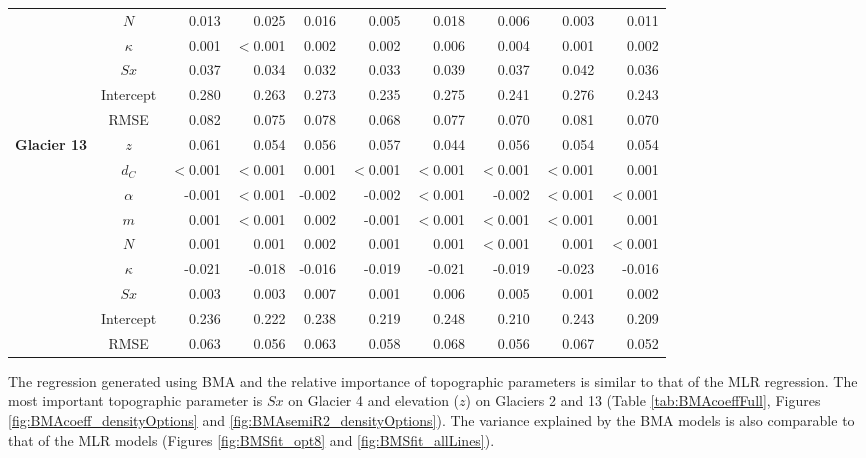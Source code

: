 \documentclass{sfuthesis}
\begin{document}
\begin{table}
\begin{tabular}{ccrrrrrrrr}
 & $N$ & 0.013 & 0.025 & 0.016 & 0.005 & 0.018 & 0.006 & 0.003 & 0.011 \\
 & $\kappa$ & 0.001 & $<$0.001 & 0.002 & 0.002 & 0.006 & 0.004 & 0.001 & 0.002 \\
 & $Sx$ & 0.037 & 0.034 & 0.032 & 0.033 & 0.039 & 0.037 & 0.042 & 0.036 \\
 & Intercept & 0.280 & 0.263 & 0.273 & 0.235 & 0.275 & 0.241 & 0.276 & 0.243 \\
 & RMSE & 0.082 & 0.075 & 0.078 & 0.068 & 0.077 & 0.070 & 0.081 & 0.070 \\ \hline
\multirow{9}{*}{\textbf{Glacier 13}} & $z$ & 0.061 & 0.054 & 0.056 & 0.057 & 0.044 & 0.056 & 0.054 & 0.054 \\
 & $d_C$ & $<$0.001 & $<$0.001 & 0.001 & $<$0.001 & $<$0.001 & $<$0.001 & $<$0.001 & 0.001 \\
 & $\alpha$ & -0.001 & $<$0.001 & -0.002 & -0.002 & $<$0.001 & -0.002 & $<$0.001 & $<$0.001 \\
 & $m$ & 0.001 & $<$0.001 & 0.002 & -0.001 & $<$0.001 & $<$0.001 & $<$0.001 & 0.001 \\
 & $N$ & 0.001 & 0.001 & 0.002 & 0.001 & 0.001 & $<$0.001 & 0.001 & $<$0.001 \\
 & $\kappa$ & -0.021 & -0.018 & -0.016 & -0.019 & -0.021 & -0.019 & -0.023 & -0.016 \\
 & $Sx$ & 0.003 & 0.003 & 0.007 & 0.001 & 0.006 & 0.005 & 0.001 & 0.002 \\
 & Intercept & 0.236 & 0.222 & 0.238 & 0.219 & 0.248 & 0.210 & 0.243 & 0.209 \\
 & RMSE & 0.063 & 0.056 & 0.063 & 0.058 & 0.068 & 0.056 & 0.067 & 0.052
\end{tabular}
\end{table}

The regression generated using BMA and the relative importance of topographic parameters is similar to that of the MLR regression. The most important topographic parameter is $Sx$ on Glacier 4 and elevation ($z$) on Glaciers 2 and 13 (Table \ref{tab:BMAcoeffFull}, Figures \ref{fig:BMAcoeff_densityOptions} and \ref{fig:BMAsemiR2_densityOptions}). The variance explained by the BMA models is also comparable to that of the MLR models (Figures \ref{fig:BMSfit_opt8} and \ref{fig:BMSfit_allLines}). 
\end{document}
